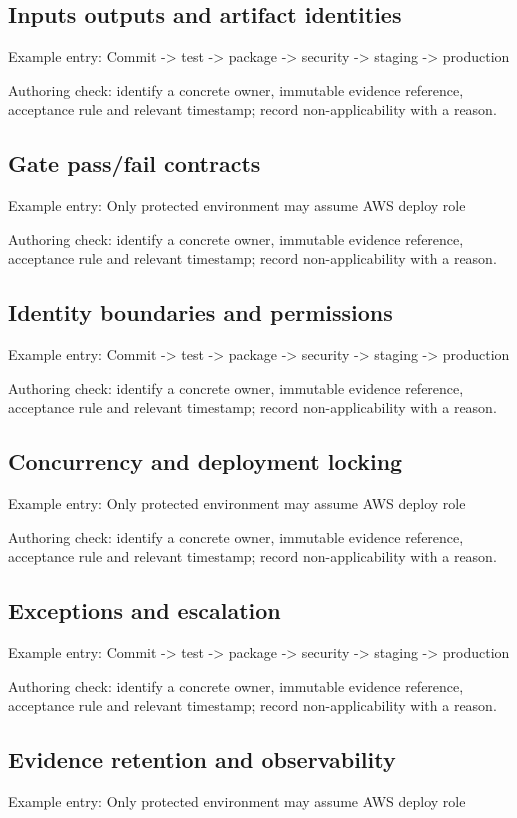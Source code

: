 \documentclass[10pt,letterpaper]{article}
\begin{document}
\subsection{Inputs outputs and artifact identities}
Example entry: Commit -> test -> package -> security -> staging -> production

Authoring check: identify a concrete owner, immutable evidence reference, acceptance rule and relevant timestamp; record non-applicability with a reason.


\subsection{Gate pass/fail contracts}
Example entry: Only protected environment may assume AWS deploy role

Authoring check: identify a concrete owner, immutable evidence reference, acceptance rule and relevant timestamp; record non-applicability with a reason.


\subsection{Identity boundaries and permissions}
Example entry: Commit -> test -> package -> security -> staging -> production

Authoring check: identify a concrete owner, immutable evidence reference, acceptance rule and relevant timestamp; record non-applicability with a reason.


\subsection{Concurrency and deployment locking}
Example entry: Only protected environment may assume AWS deploy role

Authoring check: identify a concrete owner, immutable evidence reference, acceptance rule and relevant timestamp; record non-applicability with a reason.


\subsection{Exceptions and escalation}
Example entry: Commit -> test -> package -> security -> staging -> production

Authoring check: identify a concrete owner, immutable evidence reference, acceptance rule and relevant timestamp; record non-applicability with a reason.


\subsection{Evidence retention and observability}
Example entry: Only protected environment may assume AWS deploy role
\end{document}
